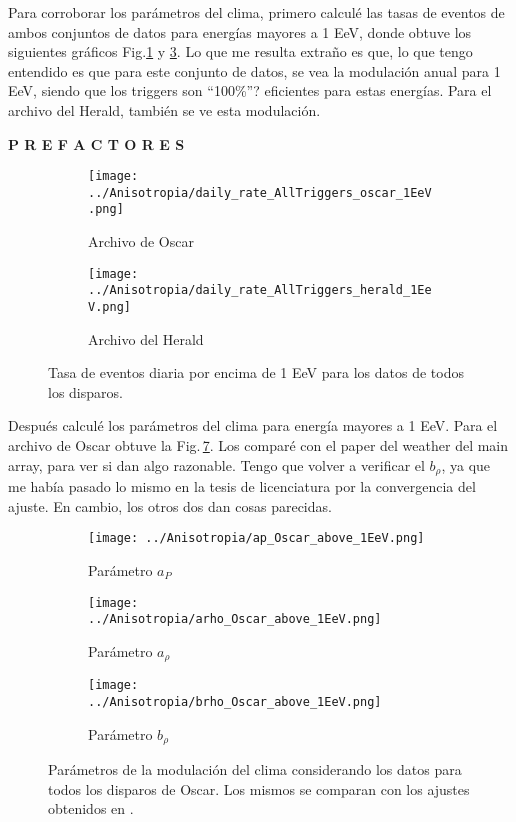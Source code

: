 Para corroborar los parámetros del clima, primero calculé las tasas de eventos de ambos conjuntos de datos para energías mayores a 1  EeV, donde obtuve los siguientes gráficos Fig.\ref{fig:rate_daily_oscar_1EeV} y \ref{fig:rate_daily_herald_1EeV}.  Lo que me resulta extraño es que, lo que tengo entendido es que para este conjunto de datos, se vea la modulación anual para  1 EeV, siendo que los triggers son ``100\%''? eficientes para estas energías. Para el archivo del Herald, también se ve esta modulación.



\textbf{P R E F A C T O R E S}
\begin{figure}[H]

	\begin{subfigure}[b]{0.5\textwidth}
	\centering
	\texttt{[image: ../Anisotropia/daily\_rate\_AllTriggers\_oscar\_1EeV.png]}
	\caption{Archivo de Oscar} 	\label{fig:rate_daily_oscar_1EeV}
	\end{subfigure}%
\hfill
	\begin{subfigure}[b]{0.5\textwidth}
	\centering
	\texttt{[image: ../Anisotropia/daily\_rate\_AllTriggers\_herald\_1EeV.png]}
	\caption{Archivo del Herald} 	\label{fig:rate_daily_herald_1EeV}
	\end{subfigure}
	\caption{Tasa de eventos diaria por encima de 1 EeV para los datos de todos los disparos.}
\end{figure}

Después calculé los parámetros del clima para energía mayores a 1 EeV. Para el archivo de Oscar obtuve la Fig.\,\ref{fig:parameters_oscar_1EeV}. Los comparé con el paper del weather del main array, para ver si dan algo razonable. Tengo que volver a verificar el $b_\rho$, ya que me había pasado lo mismo en la tesis de licenciatura por la convergencia del ajuste. En cambio, los otros dos dan cosas parecidas.

\begin{figure}[H]
	\begin{subfigure}[b]{0.5\textwidth}
	\texttt{[image: ../Anisotropia/ap\_Oscar\_above\_1EeV.png]}
	\caption{Parámetro $a_P$ }
	\label{fig:ap_oscar_1EeV}
	\end{subfigure}%
	\hspace{\fill}
	\begin{subfigure}[b]{0.5\textwidth}
	\texttt{[image: ../Anisotropia/arho\_Oscar\_above\_1EeV.png]}
	\caption{Parámetro $a_{\rho}$ }
	\label{fig:arho_oscar_1EeV}
	\end{subfigure}%
	\hspace{\fill}
	\begin{subfigure}[b]{\textwidth}
	\centering
	\texttt{[image: ../Anisotropia/brho\_Oscar\_above\_1EeV.png]}
	\caption{Parámetro  $b_\rho$	 }
	\label{fig:brho_oscar_1EeV}
	\end{subfigure}%
	\caption{Parámetros de la modulación del clima considerando los datos para todos los disparos de Oscar. Los mismos se comparan con los ajustes obtenidos en \cite{aab2017impact}.}\label{fig:parameters_oscar_1EeV}
\end{figure}

